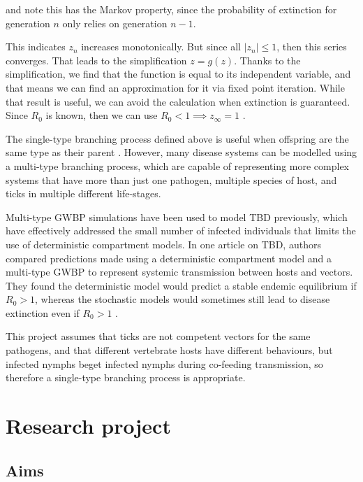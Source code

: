 \documentclass{article}
\begin{document}
and note this has the Markov property, since the probability of extinction for generation $ n $ only relies on generation $ n-1 $.

This indicates $ z_n $ increases monotonically. But since all $ |z_n| \le 1 $, then this series converges. That leads to the simplification $ z = g(z) $. Thanks to the simplification, we find that the function is equal to its independent variable, and that means we can find an approximation for it via fixed point iteration. While that result is useful, we can avoid the calculation when extinction is guaranteed. Since $ R_0 $ is known, then we can use $ R_0 <1 \implies z_{\infty} = 1 $ \cite{Diekman2000}.

The single-type branching process defined above is useful when offspring are the same type as their parent \cite{Allen2019}. However, many disease systems can be modelled using a multi-type branching process, which are capable of representing more complex systems that have more than just one pathogen, multiple species of host, and ticks in multiple different life-stages.

Multi-type GWBP simulations have been used to model TBD previously, which have effectively addressed the small number of infected individuals that limits the use of deterministic compartment models. In one article on TBD, authors compared predictions made using a deterministic compartment model and a multi-type GWBP to represent systemic transmission between hosts and vectors. They found the deterministic model would predict a stable endemic equilibrium if $ R_0 > 1 $, whereas the stochastic models would sometimes still lead to disease extinction even if $ R_0 > 1 $ \cite{Maliyoni_2017}. 

This project assumes that ticks are not competent vectors for the same pathogens, and that different vertebrate hosts have different behaviours, but infected nymphs beget infected nymphs during co-feeding transmission, so therefore a single-type branching process is appropriate.

\newpage

\section{Research project}

\subsection{Aims}
\end{document}
